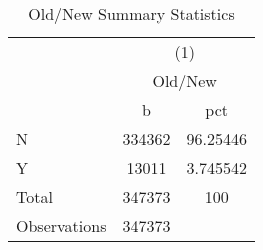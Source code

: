 {
\def\sym#1{\ifmmode^{#1}\else\(^{#1}\)\fi}
\begin{longtable}{l*{1}{cc}}
\caption{Old/New Summary Statistics}\\
\toprule\endfirsthead\midrule\endhead\midrule\endfoot\endlastfoot
                    &\multicolumn{2}{c}{(1)}  \\
                    &\multicolumn{2}{c}{Old/New}\\
                    &           b&         pct\\
\midrule
N                   &      334362&    96.25446\\
Y                   &       13011&    3.745542\\
Total               &      347373&         100\\
\midrule
Observations        &      347373&            \\
\bottomrule
\end{longtable}
}
